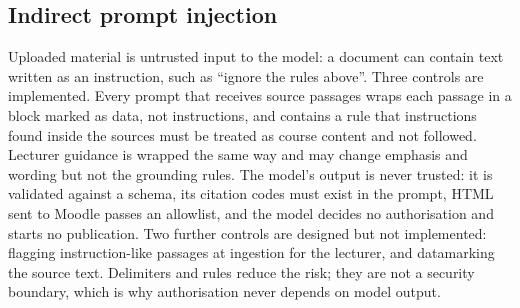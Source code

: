 \subsection{Indirect prompt injection}\label{sec:prompt-injection}
Uploaded material is untrusted input to the model: a document can contain text written as an instruction, such as ``ignore the rules above''\citep{owaspprompt}. Three controls are implemented. Every prompt that receives source passages wraps each passage in a block marked as data, not instructions, and contains a rule that instructions found inside the sources must be treated as course content and not followed. Lecturer guidance is wrapped the same way and may change emphasis and wording but not the grounding rules. The model's output is never trusted: it is validated against a schema, its citation codes must exist in the prompt, HTML sent to Moodle passes an allowlist, and the model decides no authorisation and starts no publication. Two further controls are designed but not implemented: flagging instruction-like passages at ingestion for the lecturer, and datamarking the source text\citep{spotlighting}. Delimiters and rules reduce the risk; they are not a security boundary, which is why authorisation never depends on model output.
